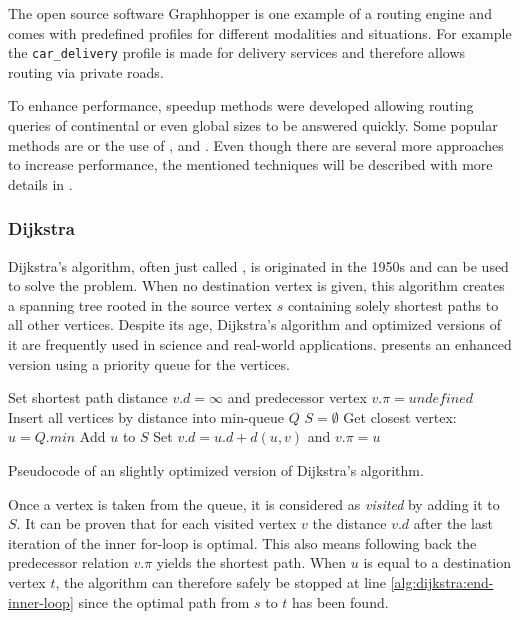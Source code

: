 		The open source software Graphhopper is one example of a routing engine and comes with predefined profiles for different modalities and situations.
		For example the \texttt{car\_delivery} profile is made for delivery services and therefore allows routing via private roads\cite{graphhopper-routing-profiles}.
		
		To enhance performance, speedup methods were developed allowing routing queries of continental or even global sizes to be answered quickly.
		Some popular methods are  or the use of ,  and .
		Even though there are several more approaches to increase performance, the mentioned techniques will be described with more details in .
		
		\subsubsection{Dijkstra}
		\label{subsubsec:dijkstra}
		
			Dijkstra's algorithm, often just called , is originated in the 1950s and can be used to solve the  problem.
			When no destination vertex is given, this algorithm creates a spanning tree rooted in the source vertex $s$ containing solely shortest paths to all other vertices.
			Despite its age, Dijkstra's algorithm and optimized versions of it are frequently used in science and real-world applications.
			 presents an enhanced version using a priority queue for the vertices\cite[658]{cormen-introduction-to-alg}.
			
			\begin{algorithm}[h]
				\begin{algorithmic}[1]
						\State Set shortest path distance $v.d = \infty$ and predecessor vertex $v.\pi = undefined$
					\EndFor
					\State Insert all vertices by distance into min-queue $Q$
					\State $S = \emptyset$
						\State Get closest vertex: $u = Q.min$
							\State Add $u$ to $S$
								\State Set $v.d = u.d + d(u, v)$ and $v.\pi = u$
							\EndIf
						\EndFor \label{alg:dijkstra:end-inner-loop}
					\EndWhile
				\end{algorithmic}
				\caption{Pseudocode of an slightly optimized version of Dijkstra's algorithm.}
				\label{alg:dijkstra}
			\end{algorithm}
			\noindent
			Once a vertex is taken from the queue, it is considered as \emph{visited} by adding it to $S$.
			It can be proven that for each visited vertex $v$ the distance $v.d$ after the last iteration of the inner for-loop is optimal\cite[659-661]{cormen-introduction-to-alg}.
			This also means following back the predecessor relation $v.\pi$ yields the shortest path.
			When $u$ is equal to a destination vertex $t$, the algorithm can therefore safely be stopped at line \ref{alg:dijkstra:end-inner-loop} since the optimal path from $s$ to $t$ has been found.
		

